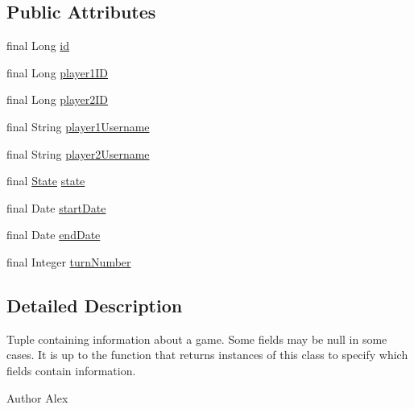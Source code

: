 \subsection*{Public Attributes}
\begin{DoxyCompactItemize}
\item 
final Long \hyperlink{classpt_1_1up_1_1fe_1_1lpro1613_1_1sharedlib_1_1structs_1_1_game_info_adb09167b90f2eec153dcbaa446ff339d}{id}
\item 
final Long \hyperlink{classpt_1_1up_1_1fe_1_1lpro1613_1_1sharedlib_1_1structs_1_1_game_info_aef64a242737d860c02cc062c6f7ce737}{player1\+ID}
\item 
final Long \hyperlink{classpt_1_1up_1_1fe_1_1lpro1613_1_1sharedlib_1_1structs_1_1_game_info_a0f84cb7487202f0602d6df2b2291985c}{player2\+ID}
\item 
final String \hyperlink{classpt_1_1up_1_1fe_1_1lpro1613_1_1sharedlib_1_1structs_1_1_game_info_abedaccd1dc1cd6598ef34a42f9a8241f}{player1\+Username}
\item 
final String \hyperlink{classpt_1_1up_1_1fe_1_1lpro1613_1_1sharedlib_1_1structs_1_1_game_info_a39ad9d8b40f68dc569b9ff0c9a3a526e}{player2\+Username}
\item 
final \hyperlink{enumpt_1_1up_1_1fe_1_1lpro1613_1_1sharedlib_1_1structs_1_1_game_info_1_1_state}{State} \hyperlink{classpt_1_1up_1_1fe_1_1lpro1613_1_1sharedlib_1_1structs_1_1_game_info_ad3e13822945c29f610ec4a6450ce9798}{state}
\item 
final Date \hyperlink{classpt_1_1up_1_1fe_1_1lpro1613_1_1sharedlib_1_1structs_1_1_game_info_a1832d7b01c7b8be4da35f1df697a5aaf}{start\+Date}
\item 
final Date \hyperlink{classpt_1_1up_1_1fe_1_1lpro1613_1_1sharedlib_1_1structs_1_1_game_info_a31879c76b0c3c6f4510e09e75dc07085}{end\+Date}
\item 
final Integer \hyperlink{classpt_1_1up_1_1fe_1_1lpro1613_1_1sharedlib_1_1structs_1_1_game_info_a9e2e58268f9fd75167b9a1f388863549}{turn\+Number}
\end{DoxyCompactItemize}


\subsection{Detailed Description}
Tuple containing information about a game. Some fields may be null in some cases. It is up to the function that returns instances of this class to specify which fields contain information.

\begin{DoxyAuthor}{Author}
Alex 
\end{DoxyAuthor}



